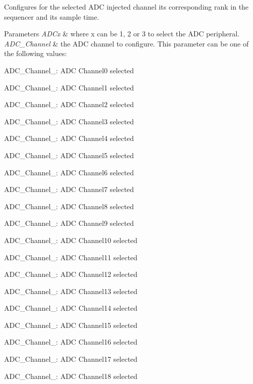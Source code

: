 Configures for the selected A\+DC injected channel its corresponding rank in the sequencer and its sample time. 


\begin{DoxyParams}{Parameters}
{\em A\+D\+Cx} & where x can be 1, 2 or 3 to select the A\+DC peripheral. \\
\hline
{\em A\+D\+C\+\_\+\+Channel} & the A\+DC channel to configure. This parameter can be one of the following values\+: \begin{DoxyItemize}
\item A\+D\+C\+\_\+\+Channel\+\_\+: A\+DC Channel0 selected \item A\+D\+C\+\_\+\+Channel\+\_\+: A\+DC Channel1 selected \item A\+D\+C\+\_\+\+Channel\+\_\+: A\+DC Channel2 selected \item A\+D\+C\+\_\+\+Channel\+\_\+: A\+DC Channel3 selected \item A\+D\+C\+\_\+\+Channel\+\_\+: A\+DC Channel4 selected \item A\+D\+C\+\_\+\+Channel\+\_\+: A\+DC Channel5 selected \item A\+D\+C\+\_\+\+Channel\+\_\+: A\+DC Channel6 selected \item A\+D\+C\+\_\+\+Channel\+\_\+: A\+DC Channel7 selected \item A\+D\+C\+\_\+\+Channel\+\_\+: A\+DC Channel8 selected \item A\+D\+C\+\_\+\+Channel\+\_\+: A\+DC Channel9 selected \item A\+D\+C\+\_\+\+Channel\+\_\+: A\+DC Channel10 selected \item A\+D\+C\+\_\+\+Channel\+\_\+: A\+DC Channel11 selected \item A\+D\+C\+\_\+\+Channel\+\_\+: A\+DC Channel12 selected \item A\+D\+C\+\_\+\+Channel\+\_\+: A\+DC Channel13 selected \item A\+D\+C\+\_\+\+Channel\+\_\+: A\+DC Channel14 selected \item A\+D\+C\+\_\+\+Channel\+\_\+: A\+DC Channel15 selected \item A\+D\+C\+\_\+\+Channel\+\_\+: A\+DC Channel16 selected \item A\+D\+C\+\_\+\+Channel\+\_\+: A\+DC Channel17 selected \item A\+D\+C\+\_\+\+Channel\+\_\+: A\+DC Channel18 selected \end{DoxyItemize}
\\

\end{DoxyParams}
